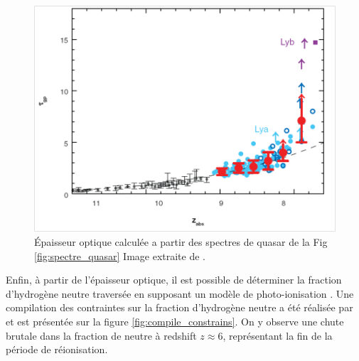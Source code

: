 \begin{figure}
        \includegraphics[width=.95\linewidth]{img/01/epaisseur_optique_quasar.png} 
        \caption[Epaisseur optique Lyman alpha]{%
		Épaisseur optique calculée a partir des spectres de quasar de la Fig\,\ref{fig:spectre_quasar}
        Image extraite de \cite{fan_constraining_2006}.}
 		\label{fig:epaisseur_optique_quasar}
\end{figure}


Enfin, à partir de l'épaisseur optique, il est possible de déterminer la fraction d'hydrogène neutre traversée en supposant un modèle de photo-ionisation \citep{miralda-escude_reionization_2000}.
Une compilation des contraintes sur la fraction d'hydrogène neutre a été réalisée par \cite{2015ApJ...811..140B} et est présentée sur la figure \ref{fig:compile_constrains}.
On y observe une chute brutale dans la fraction de neutre à redshift $z\approx6$, représentant la fin de la période de réionisation.

